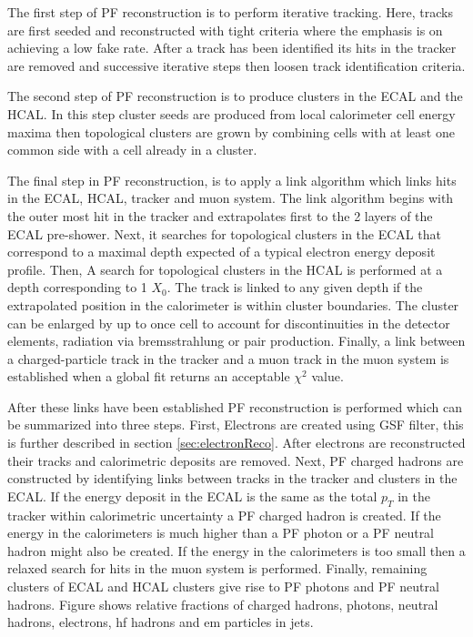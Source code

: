 The first step of PF reconstruction is to perform
iterative tracking. Here, tracks are first seeded and reconstructed with tight criteria
where the emphasis is on achieving a low fake rate. 
After a track has been identified its hits in the tracker are removed and successive iterative steps
then loosen track identification criteria.

The second step of PF reconstruction is to produce clusters in the ECAL and the HCAL. 
In this step cluster seeds are produced from local calorimeter cell energy maxima
then topological clusters are grown by combining cells with at least one common side
with a cell already in a cluster. 

The final step in PF reconstruction, is to apply a link algorithm which links
hits in the ECAL, HCAL, tracker and muon system. The link algorithm
begins with the outer most hit in the tracker and extrapolates
first to the 2 layers of the ECAL pre-shower. Next, it searches for topological clusters
in the ECAL that correspond to a maximal depth expected of a typical
electron energy deposit profile. Then, A search for topological clusters in the
HCAL is performed at a depth corresponding to 1 $X_{0}$.
The track is linked to any given depth if the extrapolated position in 
the calorimeter is within cluster boundaries. The cluster can be enlarged by up 
to once cell to account for discontinuities in the detector elements, radiation via
bremsstrahlung or pair production. Finally, a link between a charged-particle
track in the tracker and a muon track in the muon system is established
when a global fit returns an acceptable $\chi^{2}$ value.

After these links have been established PF reconstruction is performed which
can be summarized into three steps. First, Electrons are created using GSF filter,
this is further described in section \ref{sec:electronReco}. After electrons
are reconstructed their tracks and calorimetric deposits are removed. Next, 
PF charged hadrons are constructed by identifying links between tracks in the 
tracker and clusters in the ECAL. If the energy deposit in the ECAL is 
the same as the total $p_{T}$ in the tracker within calorimetric uncertainty a 
PF charged hadron is created. If the energy in the calorimeters is much higher
than a PF photon or a PF neutral hadron might also be created. If the energy in 
the calorimeters is too small then a relaxed search for hits in the muon system
is performed. Finally, remaining clusters of ECAL and HCAL clusters give rise
to PF photons and PF neutral hadrons. Figure %
shows relative fractions of charged hadrons, photons, neutral hadrons, electrons,
hf hadrons and em particles in jets.

